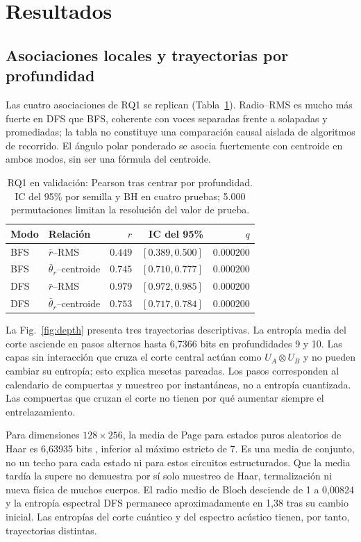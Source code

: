 \documentclass[pdflatex,iicol,sn-basic,Numbered]{sn-jnl}
\begin{document}
\section{Resultados}\label{sec:results}
\subsection{Asociaciones locales y trayectorias por profundidad}
Las cuatro asociaciones de RQ1 se replican (Tabla~\ref{tab:rq1}). Radio--RMS es mucho más fuerte en DFS que BFS, coherente con voces separadas frente a solapadas y promediadas; la tabla no constituye una comparación causal aislada de algoritmos de recorrido. El ángulo polar ponderado se asocia fuertemente con centroide en ambos modos, sin ser una fórmula del centroide.
\begin{table}[t]
\caption{RQ1 en validación: Pearson tras centrar por profundidad. IC del 95\% por semilla y BH en cuatro pruebas; 5.000 permutaciones limitan la resolución del valor de prueba.}\label{tab:rq1}
\centering\small
\begin{tabular}{llrrr}
\toprule
Modo & Relación & $r$ & IC del 95\% & $q$ \\
\midrule
BFS & $\bar r$--RMS & $0.449$ & $[0.389, 0.500]$ & $0.000200$ \\
BFS & $\bar\theta_r$--centroide & $0.745$ & $[0.710, 0.777]$ & $0.000200$ \\
DFS & $\bar r$--RMS & $0.979$ & $[0.972, 0.985]$ & $0.000200$ \\
DFS & $\bar\theta_r$--centroide & $0.753$ & $[0.717, 0.784]$ & $0.000200$ \\
\bottomrule
\end{tabular}
\end{table}


La Fig.~\ref{fig:depth} presenta tres trayectorias descriptivas. La entropía media del corte asciende en pasos alternos hasta 6,7366 bits en profundidades 9 y 10. Las capas sin interacción que cruza el corte central actúan como $U_A\otimes U_B$ y no pueden cambiar su entropía; esto explica mesetas pareadas. Los pasos corresponden al calendario de compuertas y muestreo por instantáneas, no a entropía cuantizada. Las compuertas que cruzan el corte no tienen por qué aumentar siempre el entrelazamiento.

Para dimensiones $128\times256$, la media de Page para estados puros aleatorios de Haar es 6,63935 bits \citep{Page1993}, inferior al máximo estricto de 7. Es una media de conjunto, no un techo para cada estado ni para estos circuitos estructurados. Que la media tardía la supere no demuestra por sí solo muestreo de Haar, termalización ni nueva física de muchos cuerpos. El radio medio de Bloch desciende de 1 a 0,00824 y la entropía espectral DFS permanece aproximadamente en 1,38 tras su cambio inicial. Las entropías del corte cuántico y del espectro acústico tienen, por tanto, trayectorias distintas.
\end{document}
